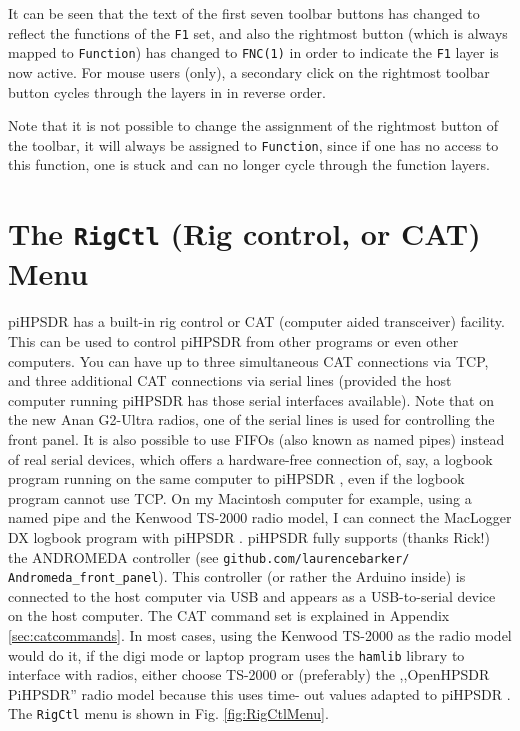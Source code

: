 \documentclass[12pt]{book}
\def\bltt#1{\texttt{\color{blue}#1}}
\def\pH{pi\-HPSDR }
\begin{document}
It can be seen that the text of the first seven toolbar buttons has changed to reflect
the functions of the \texttt{F1} set, and also the rightmost button (which is always mapped
to \bltt{Function}) has changed to \texttt{FNC(1)} in order to indicate the \texttt{F1}
layer is now active. For mouse users (only), a secondary click on the rightmost toolbar
button cycles through the layers in in reverse order.

Note that it is not possible to change the assignment of the  rightmost button of the toolbar,
it will always be assigned to \bltt{Function}, since if one has no access to this
function, one is stuck and can no longer cycle through the function layers.

\section{The \texttt{RigCtl} (Rig control, or CAT) Menu}

\pH has a built-in rig control or CAT (computer aided transceiver) facility. This can be used to control
\pH from other programs or even other computers. You can have up to three simultaneous CAT connections
via TCP, and three additional CAT connections via serial lines (provided the host computer running \pH
has those serial interfaces available). Note that on the new Anan G2-Ultra radios, one of the serial lines
is used for controlling the front panel.
It is also possible to use FIFOs (also known as named pipes) instead of real serial devices, which offers a
hardware-free connection
of, say, a logbook program running on the same computer to \pH, even if the logbook program cannot use
TCP. On my Macintosh computer for example, using a named pipe and the Kenwood TS-2000 radio model,
I can connect the MacLogger DX logbook program with \pH.
\pH fully supports (thanks Rick!) the ANDROMEDA controller (see \texttt{github.com/laurencebarker/
Andromeda\_front\_panel}).
This controller (or rather the Arduino inside) is connected to the host computer via USB and appears as a
USB-to-serial
device on the host computer. The CAT command set is explained in Appendix \ref{sec:catcommands}. In most
cases, using
the Kenwood TS-2000 as the radio model would do it, if the digi mode or laptop program uses the \texttt{hamlib} library  to
interface with
radios, either choose TS-2000 or (preferably) the ,,OpenHPSDR PiHPSDR'' radio model because this uses time-
out values
adapted to \pH. The \bltt{RigCtl} menu is shown in Fig. \ref{fig:RigCtlMenu}.
\end{document}
